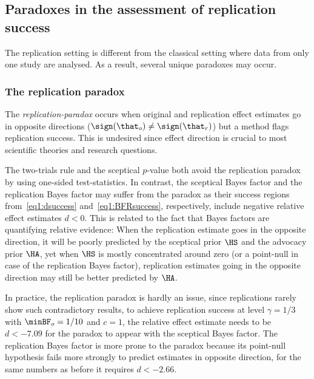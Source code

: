 \subsection{Paradoxes in the assessment of replication success}
The replication setting is different from the classical setting where data from
only one study are analysed. As a result, several unique paradoxes may occur.

\subsubsection{The replication paradox}
\label{sec1:replicationParadox}
The \emph{replication-paradox} \citep{Ly2018} occurs when original and
replication effect estimates go in opposite directions
($\sign(\that_{o}) \neq \sign(\that_{r})$) but a method flags replication
success. This is undesired since effect direction is crucial to most
scientific theories and research questions.

The two-trials rule and the sceptical $p$-value both avoid the replication
paradox by using one-sided test-statistics. In contrast, the sceptical Bayes
factor and the replication Bayes factor may suffer from the paradox as their
success regions from~\eqref{eq1:dsuccess} and~\eqref{eq1:BFRsuccess},
respectively, include negative relative effect estimates $d < 0$. This is
related to the fact that Bayes factors are quantifying relative evidence: When
the replication estimate goes in the opposite direction, it will be poorly
predicted by the sceptical prior $\HS$ and the advocacy prior $\HA$, yet when
$\HS$ is mostly concentrated around zero (or a point-null in case of the
replication Bayes factor), replication estimates going in the opposite direction
may still be better predicted by $\HA$.


In practice, the replication paradox is hardly an issue, since replications
rarely show such contradictory results, \eg to achieve replication success at
level $\gamma = 1/3$ with
$\minBF_{o} = 1/10$ and $c = 1$, the
relative effect estimate needs to be $d < -7.09$ for the
paradox to appear with the sceptical Bayes factor. The replication Bayes factor
is more prone to the paradox because its point-null hypothesis fails more
strongly to predict estimates in opposite direction, \eg for the same numbers as
before it requires $d < -2.66$.

